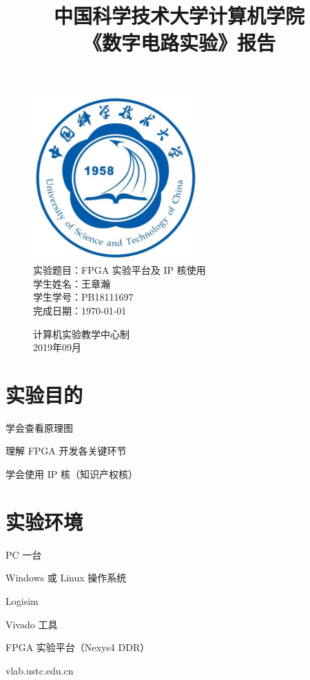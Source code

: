 \documentclass[UTF8]{article}
\title{中国科学技术大学计算机学院\\《数字电路实验》报告}
\author{}
\date{}
\begin{document}
	\maketitle
	\begin{figure}[H]
		\centering
		\includegraphics[width=2.5in]{xiaohui.jpg}\vspace{0.5cm}\\
		\large{
			实验题目：FPGA 实验平台及 IP 核使用\\
			学生姓名：王章瀚\\
			学生学号：PB18111697\\
			完成日期：\today\\
		}\vspace{2cm}
		
		\large{计算机实验教学中心制\\2019年09月\\}
		\thispagestyle{empty}
		\clearpage  %
	\end{figure}


	\section{实验目的}
	学会查看原理图\par
	理解 FPGA 开发各关键环节\par
	学会使用 IP 核（知识产权核）\par
	
	\section{实验环境}
	PC 一台\par
	Windows 或 Linux 操作系统\par
	Logisim\par
	Vivado 工具\par
	FPGA 实验平台（Nexys4 DDR）\par
	vlab.ustc.edu.cn\par
	
\end{document}

